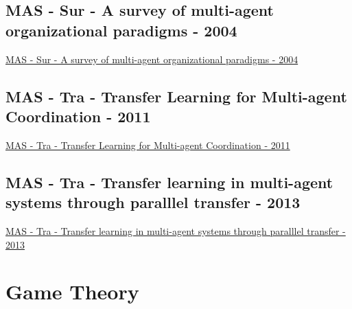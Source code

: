 \subsection{MAS - Sur - A survey of multi-agent organizational paradigms - 2004}
\href{https://dl.acm.org/doi/abs/10.1017/S0269888905000317}{MAS - Sur - A survey of multi-agent organizational paradigms - 2004}

\subsection{MAS - Tra - Transfer Learning for Multi-agent Coordination - 2011}
\href{https://www.scitepress.org/Papers/2011/31856/}{MAS - Tra - Transfer Learning for Multi-agent Coordination - 2011}

\subsection{MAS - Tra - Transfer learning in multi-agent systems through paralllel transfer - 2013}
\href{https://ulir.ul.ie/handle/10344/3305}{MAS - Tra - Transfer learning in multi-agent systems through paralllel transfer - 2013}

\section{Game Theory}
